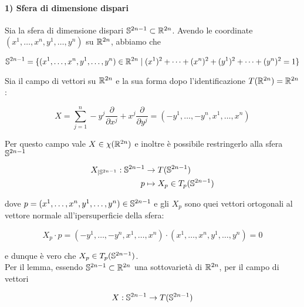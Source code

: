 \paragraph{1) Sfera di dimensione dispari}

Sia la sfera di dimensione dispari $ \S^{2n-1} \subset \R^{2n} $. Avendo le coordinate $ (x^{1},\dots,x^{n},y^{1},\dots,y^{n}) $ su $ \R^{2n} $, abbiamo che

\begin{equation}
	\S^{2n-1} = \{ (x^{1},\dots,x^{n},y^{1},\dots,y^{n}) \in \R^{2n} \mid (x^{1})^{2} + \cdots + (x^{n})^{2} + (y^{1})^{2} + \cdots + (y^{n})^{2} = 1 \}
\end{equation}

Sia il campo di vettori su $ \R^{2n} $ e la sua forma dopo l'identificazione $ T(\R^{2n}) = \R^{2n} $:

\begin{equation}
	X = \sum_{j=1}^{n} - y^{j} \dfrac{\partial}{\partial x^{j}} + x^{j} \dfrac{\partial}{\partial y^{j}} = (-y^{1},\dots,-y^{n},x^{1},\dots,x^{n})
\end{equation}

Per questo campo vale $ X \in \chi(\R^{2n}) $ e inoltre è possibile restringerlo alla sfera $ \S^{2n-1} $

\begin{align}
	\begin{split}
		X_{|\S^{2n-1}} : \S^{2n-1} &\to T(\S^{2n-1})\\
		p &\mapsto X_{p} \in T_{p}(\S^{2n-1})
	\end{split}
\end{align}

dove $ p = (x^{1},\dots,x^{n},y^{1},\dots,y^{n}) \in \S^{2n-1} $ e gli $ X_{p} $ sono quei vettori ortogonali al vettore normale all'ipersuperficie della sfera:

\begin{equation}
	X_{p} \cdot p = (-y^{1},\dots,-y^{n},x^{1},\dots,x^{n}) \cdot (x^{1},\dots,x^{n},y^{1},\dots,y^{n}) = 0
\end{equation}

e dunque è vero che $ X_{p} \in T_{p}(\S^{2n-1}) $.\\
Per il lemma, essendo $ \S^{2n-1} \subset \R^{2n} $ una sottovarietà di $ \R^{2n} $, per il campo di vettori

\begin{equation}
	X : \S^{2n-1} \to T(\S^{2n-1})
\end{equation}

